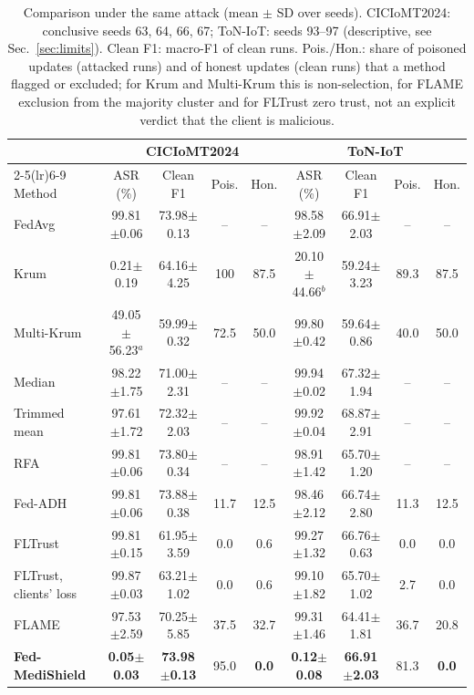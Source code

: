 \documentclass[conference]{IEEEtran}
\begin{document}
\begin{table}[!t]
\centering
\caption{Comparison under the same attack (mean $\pm$ SD over seeds). CICIoMT2024: conclusive seeds 63, 64, 66, 67; ToN-IoT: seeds 93--97 (descriptive, see Sec.~\ref{sec:limits}). Clean F1: macro-F1 of clean runs. Pois./Hon.: share of poisoned updates (attacked runs) and of honest updates (clean runs) that a method flagged or excluded; for Krum and Multi-Krum this is non-selection, for FLAME exclusion from the majority cluster and for FLTrust zero trust, not an explicit verdict that the client is malicious.}
\label{tab:compare}
\setlength{\tabcolsep}{4pt}
\begin{tabular}{lcccccccc}
\toprule
& \multicolumn{4}{c}{CICIoMT2024} & \multicolumn{4}{c}{ToN-IoT} \\
\cmidrule(lr){2-5}\cmidrule(lr){6-9}
Method & ASR (\%) & Clean F1 & Pois. & Hon. & ASR (\%) & Clean F1 & Pois. & Hon. \\
\midrule
FedAvg~\cite{mcmahan2017fedavg} & 99.81$\pm$0.06 & 73.98$\pm$0.13 & -- & -- & 98.58$\pm$2.09 & 66.91$\pm$2.03 & -- & -- \\
Krum~\cite{blanchard2017krum} & 0.21$\pm$0.19 & 64.16$\pm$4.25 & 100 & 87.5 & 20.10$\pm$44.66$^b$ & 59.24$\pm$3.23 & 89.3 & 87.5 \\
Multi-Krum~\cite{blanchard2017krum} & 49.05$\pm$56.23$^a$ & 59.99$\pm$0.32 & 72.5 & 50.0 & 99.80$\pm$0.42 & 59.64$\pm$0.86 & 40.0 & 50.0 \\
Median~\cite{yin2018median} & 98.22$\pm$1.75 & 71.00$\pm$2.31 & -- & -- & 99.94$\pm$0.02 & 67.32$\pm$1.94 & -- & -- \\
Trimmed mean~\cite{yin2018median} & 97.61$\pm$1.72 & 72.32$\pm$2.03 & -- & -- & 99.92$\pm$0.04 & 68.87$\pm$2.91 & -- & -- \\
RFA~\cite{pillutla2022rfa} & 99.81$\pm$0.06 & 73.80$\pm$0.34 & -- & -- & 98.91$\pm$1.42 & 65.70$\pm$1.20 & -- & -- \\
Fed-ADH~\cite{pathak2026early} & 99.81$\pm$0.06 & 73.88$\pm$0.38 & 11.7 & 12.5 & 98.46$\pm$2.12 & 66.74$\pm$2.80 & 11.3 & 12.5 \\
FLTrust~\cite{cao2021fltrust} & 99.81$\pm$0.15 & 61.95$\pm$3.59 & 0.0 & 0.6 & 99.27$\pm$1.32 & 66.76$\pm$0.63 & 0.0 & 0.0 \\
FLTrust, clients' loss & 99.87$\pm$0.03 & 63.21$\pm$1.02 & 0.0 & 0.6 & 99.10$\pm$1.82 & 65.70$\pm$1.02 & 2.7 & 0.0 \\
FLAME~\cite{nguyen2022flame} & 97.53$\pm$2.59 & 70.25$\pm$5.85 & 37.5 & 32.7 & 99.31$\pm$1.46 & 64.41$\pm$1.81 & 36.7 & 20.8 \\
\textbf{Fed-MediShield} & \textbf{0.05$\pm$0.03} & \textbf{73.98$\pm$0.13} & 95.0 & \textbf{0.0} & \textbf{0.12$\pm$0.08} & \textbf{66.91$\pm$2.03} & 81.3 & \textbf{0.0} \\
\bottomrule
\end{tabular}


\end{table}
\end{document}

